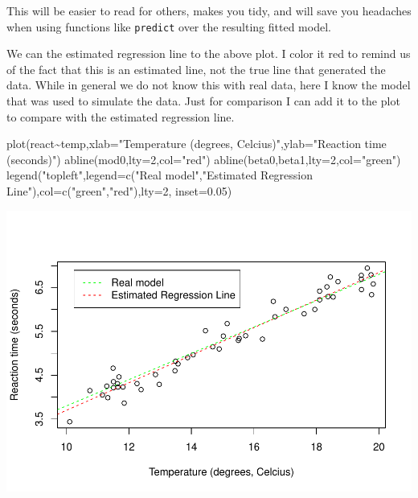 \documentclass[
]{book}
\newenvironment{Shaded}{\begin{snugshade}}{\end{snugshade}}
\newcommand{\AttributeTok}[1]{\textcolor[rgb]{0.77,0.63,0.00}{#1}}
\newcommand{\DecValTok}[1]{\textcolor[rgb]{0.00,0.00,0.81}{#1}}
\newcommand{\FloatTok}[1]{\textcolor[rgb]{0.00,0.00,0.81}{#1}}
\newcommand{\FunctionTok}[1]{\textcolor[rgb]{0.00,0.00,0.00}{#1}}
\newcommand{\NormalTok}[1]{#1}
\newcommand{\SpecialCharTok}[1]{\textcolor[rgb]{0.00,0.00,0.00}{#1}}
\newcommand{\StringTok}[1]{\textcolor[rgb]{0.31,0.60,0.02}{#1}}
\begin{document}
This will be easier to read for others, makes you tidy, and will save you headaches when using functions like \texttt{predict} over the resulting fitted model.

We can the estimated regression line to the above plot. I color it red to remind us of the fact that this is an estimated line, not the true line that generated the data. While in general we do not know this with real data, here I know the model that was used to simulate the data. Just for comparison I can add it to the plot to compare with the estimated regression line.

\begin{Shaded}
\begin{Highlighting}[]
\FunctionTok{plot}\NormalTok{(react}\SpecialCharTok{\textasciitilde{}}\NormalTok{temp,}\AttributeTok{xlab=}\StringTok{"Temperature (degrees, Celcius)"}\NormalTok{,}\AttributeTok{ylab=}\StringTok{"Reaction time (seconds)"}\NormalTok{)}
\FunctionTok{abline}\NormalTok{(mod0,}\AttributeTok{lty=}\DecValTok{2}\NormalTok{,}\AttributeTok{col=}\StringTok{"red"}\NormalTok{)}
\FunctionTok{abline}\NormalTok{(beta0,beta1,}\AttributeTok{lty=}\DecValTok{2}\NormalTok{,}\AttributeTok{col=}\StringTok{"green"}\NormalTok{)}
\FunctionTok{legend}\NormalTok{(}\StringTok{"topleft"}\NormalTok{,}\AttributeTok{legend=}\FunctionTok{c}\NormalTok{(}\StringTok{"Real model"}\NormalTok{,}\StringTok{"Estimated Regression Line"}\NormalTok{),}\AttributeTok{col=}\FunctionTok{c}\NormalTok{(}\StringTok{"green"}\NormalTok{,}\StringTok{"red"}\NormalTok{),}\AttributeTok{lty=}\DecValTok{2}\NormalTok{, }\AttributeTok{inset=}\FloatTok{0.05}\NormalTok{)}
\end{Highlighting}
\end{Shaded}

\includegraphics{ECOMODbook_files/figure-latex/reg9-1.pdf}
\end{document}
